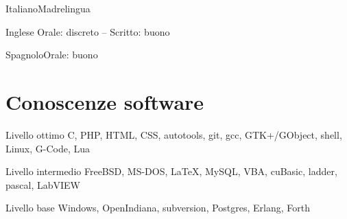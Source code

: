 \documentclass[10pt]{tccv}
\begin{document}
\begin{factlist}
\item{Italiano}{Madrelingua}
\item{Inglese} {Orale: discreto -- Scritto: buono}
\item{Spagnolo}{Orale: buono}
\end{factlist}

\section{Conoscenze software}

\begin{factlist}

\item{Livello ottimo}
     {C, PHP, HTML, CSS, autotools, git, gcc, GTK+/GObject, shell,
      Linux, G-Code, Lua}

\item{Livello intermedio}
     {FreeBSD, MS-DOS, \LaTeX, MySQL, VBA, cuBasic, ladder, pascal,
      LabVIEW}

\item{Livello base}
     {Windows, OpenIndiana, subversion,  Postgres, Erlang, Forth}

\end{factlist}
\end{document}
